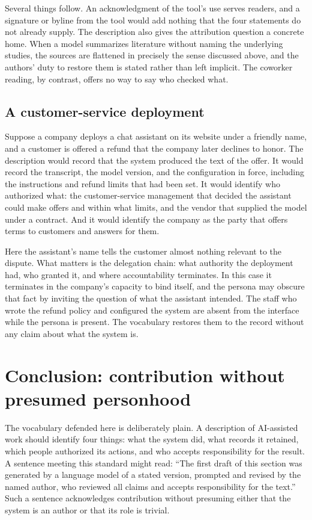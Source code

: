 \documentclass[11pt]{article}
\begin{document}
Several things follow. An acknowledgment of the tool's use serves readers, and a signature or byline from the tool would add nothing that the four statements do not already supply. The description also gives the attribution question a concrete home. When a model summarizes literature without naming the underlying studies, the sources are flattened in precisely the sense discussed above, and the authors' duty to restore them is stated rather than left implicit. The coworker reading, by contrast, offers no way to say who checked what.

\subsection{A customer-service deployment}

Suppose a company deploys a chat assistant on its website under a friendly name, and a customer is offered a refund that the company later declines to honor. The description would record that the system produced the text of the offer. It would record the transcript, the model version, and the configuration in force, including the instructions and refund limits that had been set. It would identify who authorized what: the customer-service management that decided the assistant could make offers and within what limits, and the vendor that supplied the model under a contract. And it would identify the company as the party that offers terms to customers and answers for them.

Here the assistant's name tells the customer almost nothing relevant to the dispute. What matters is the delegation chain: what authority the deployment had, who granted it, and where accountability terminates. In this case it terminates in the company's capacity to bind itself, and the persona may obscure that fact by inviting the question of what the assistant intended. The staff who wrote the refund policy and configured the system are absent from the interface while the persona is present. The vocabulary restores them to the record without any claim about what the system is.

\section{Conclusion: contribution without presumed personhood}

The vocabulary defended here is deliberately plain. A description of AI-assisted work should identify four things: what the system did, what records it retained, which people authorized its actions, and who accepts responsibility for the result. A sentence meeting this standard might read: ``The first draft of this section was generated by a language model of a stated version, prompted and revised by the named author, who reviewed all claims and accepts responsibility for the text.'' Such a sentence acknowledges contribution without presuming either that the system is an author or that its role is trivial.
\end{document}
